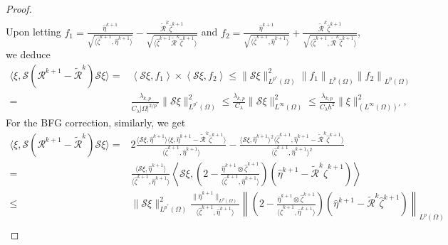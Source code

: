 \documentclass[onefignum,onetabnum]{siamart190516}
\numberwithin{equation}{section}
\begin{document}
\begin{proof}
\begin{align*}
\end{align*}
Upon letting
$f_{1}= \frac{\hat{\eta}^{k+1}}{\sqrt{\langle \hat{\zeta}^{k+1}, \hat{\eta}^{k+1} \rangle}} - \frac{\widetilde{\mathcal{R}}^{k}\hat{\zeta}^{k+1}}{\sqrt{\langle \hat{\zeta}^{k+1} \widetilde{\mathcal{R}}^{k}\hat{\zeta}^{k+1} \rangle}}$ and $
f_{2}=\frac{\hat{\eta}^{k+1}}{\sqrt{\langle \hat{\zeta}^{k+1}, \hat{\eta}^{k+1} \rangle}} + \frac{\widetilde{\mathcal{R}}^{k}\hat{\zeta}^{k+1}}{\sqrt{\langle \hat{\zeta}^{k+1}, \widetilde{\mathcal{R}}^{k}\hat{\zeta}^{k+1} \rangle}}$,
we deduce 
\begin{align*}
\langle \xi, \mathcal{S}(\mathcal{R}^{k+1} - \widetilde{\mathcal{R}}^{k})\mathcal{S}\xi \rangle=&\left\langle \mathcal{S}\xi,f_{1} \right\rangle\times \left\langle \mathcal{S}\xi, f_{2}\right\rangle\leq \|\mathcal{S}\xi\|_{L^{p^{*}}(\Omega)}^{2} \left\|f_{1} \right\|_{L^{p}(\Omega)}
\left\|f_{2} \right\|_{L^{p}(\Omega)} \\
=& \frac{\lambda_{k,p}}{C_{\lambda}|\Omega|^{2/p^{*}}}\|\mathcal{S}\xi\|_{L^{p^{*}}(\Omega)}^{2} \leq \frac{\lambda_{k,p}}{C_{\lambda}}\|\mathcal{S}\xi\|_{L^{\infty}(\Omega)}^{2} \leq\frac{\lambda_{k,p}}{C_{\lambda}h^{2}}\|\xi\|_{(L^{\infty}(\Omega))'}^{2},
\end{align*}
For the BFG correction, similarly, we get
\begin{align*}
\langle \xi, \mathcal{S}(\mathcal{R}^{k+1} - \widetilde{\mathcal{R}}^{k})\mathcal{S}\xi \rangle
=& 2 \frac{\langle \mathcal{S}\xi, \hat{\eta}^{k+1} \rangle \langle \xi, \hat{\eta}^{k+1} - \widetilde{\mathcal{R}}^{k}\hat{\zeta}^{k+1} \rangle}{\langle \hat{\zeta}^{k+1}, \hat{\eta}^{k+1} \rangle} - \frac{\langle \mathcal{S}\xi, \hat{\eta}^{k+1} \rangle^{2} \langle \hat{\zeta}^{k+1}, \hat{\eta}^{k+1} - \widetilde{\mathcal{R}}^{k}\hat{\zeta}^{k+1} \rangle}{\langle \hat{\zeta}^{k+1}, \hat{\eta}^{k+1} \rangle^{2}} \\
=& \frac{\langle \mathcal{S}\xi, \hat{\eta}^{k+1} \rangle}{\langle \hat{\zeta}^{k+1}, \hat{\eta}^{k+1} \rangle} \left\langle \mathcal{S}\xi, \left(2 - \frac{\hat{\eta}^{k+1} \otimes \hat{\zeta}^{k+1}}{\langle \hat{\zeta}^{k+1}, \hat{\eta}^{k+1} \rangle}\right)\left(\hat{\eta}^{k+1} - \widetilde{\mathcal{R}}^{k}\hat{\zeta}^{k+1}\right) \right\rangle \\
\leq& \|\mathcal{S}\xi\|_{L^{p^{*}}(\Omega)}^{2} \frac{\|\hat{\eta}^{k+1}\|_{L^{p}(\Omega)}}{\langle \hat{\zeta}^{k+1}, \hat{\eta}^{k+1} \rangle} \left\| \left(2 - \frac{\hat{\eta}^{k+1} \otimes \hat{\zeta}^{k+1}}{\langle \hat{\zeta}^{k+1}, \hat{\eta}^{k+1} \rangle}\right)\left(\hat{\eta}^{k+1} - \widetilde{\mathcal{R}}^{k}\hat{\zeta}^{k+1}\right) \right\|_{L^{p}(\Omega)} \\

\end{align*}
\end{proof}
\end{document}
